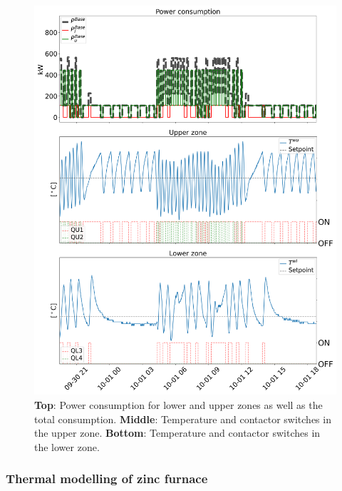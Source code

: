 \documentclass[sigconf]{acmart}
\begin{document}
\begin{figure}[t]
    \centering
    \includegraphics[width=\columnwidth]{figures/data_visualization.png}
    \caption{\textbf{Top}: Power consumption for lower and upper zones as well as the total consumption. \textbf{Middle}: Temperature and contactor switches in the upper zone. \textbf{Bottom}: Temperature and contactor switches in the lower zone.}
    \label{fig:data_visualization}
\end{figure}

\subsubsection{Thermal modelling of zinc furnace}
\end{document}
